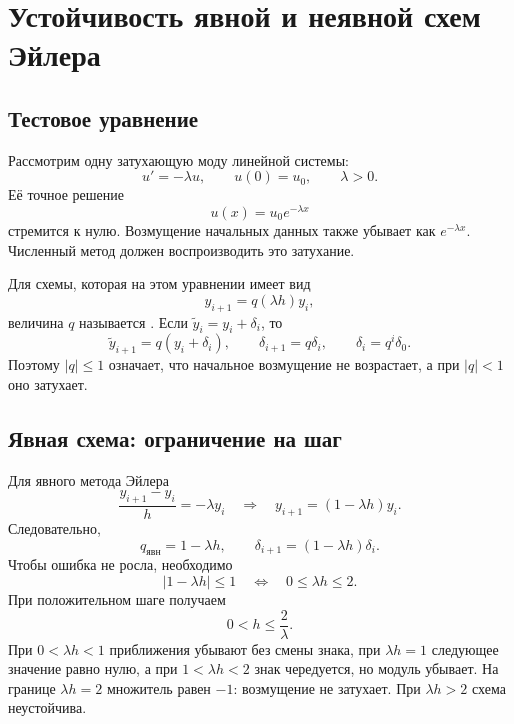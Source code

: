 \documentclass[../final.tex]{subfiles}
\begin{document}
\ifSubfilesClassLoaded{\setcounter{chapter}{5}\setcounter{section}{8}}{}
\captionsetup{font=footnotesize,labelfont=bf,skip=5pt}

\section{Устойчивость явной и неявной схем Эйлера}

\subsection{Тестовое уравнение}

Рассмотрим одну затухающую моду линейной системы:
\begin{equation*}
    u'=-\lambda u,\qquad u(0)=u_0,\qquad \lambda>0.
\end{equation*}
Её точное решение
\begin{equation*}
    u(x)=u_0e^{-\lambda x}
\end{equation*}
стремится к нулю. Возмущение начальных данных также убывает как
$e^{-\lambda x}$. Численный метод должен воспроизводить это затухание.

Для схемы, которая на этом уравнении имеет вид
\begin{equation*}
    y_{i+1}=q(\lambda h)y_i,
\end{equation*}
величина $q$ называется .
Если $\widetilde y_i=y_i+\delta_i$, то
\begin{equation*}
    \widetilde y_{i+1}=q(y_i+\delta_i),\qquad
    \delta_{i+1}=q\delta_i,\qquad
    \delta_i=q^i\delta_0.
\end{equation*}
Поэтому $|q|\le1$ означает, что начальное возмущение не возрастает,
а при $|q|<1$ оно затухает.

\subsection{Явная схема: ограничение на шаг}

Для явного метода Эйлера
\begin{equation*}
    \frac{y_{i+1}-y_i}{h}=-\lambda y_i
    \quad\Longrightarrow\quad
    y_{i+1}=(1-\lambda h)y_i.
\end{equation*}
Следовательно,
\begin{equation*}
    q_{\text{явн}}=1-\lambda h,\qquad
    \delta_{i+1}=(1-\lambda h)\delta_i.
\end{equation*}
Чтобы ошибка не росла, необходимо
\begin{equation*}
    |1-\lambda h|\le1
    \quad\Longleftrightarrow\quad
    0\le\lambda h\le2.
\end{equation*}
При положительном шаге получаем 
\begin{equation*}
    0<h\le\frac2\lambda.
\end{equation*}
При $0<\lambda h<1$ приближения убывают без смены знака,
при $\lambda h=1$ следующее значение равно нулю, а при
$1<\lambda h<2$ знак чередуется, но модуль убывает.
На границе $\lambda h=2$ множитель равен $-1$: возмущение
не затухает. При $\lambda h>2$ схема неустойчива.
\end{document}
